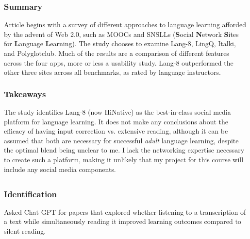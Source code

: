 \documentclass[
	letterpaper, %
]{jdf}
\begin{document}
\subsubsection{Summary}
Article begins with a survey of different approaches to language learning afforded by the advent of Web 2.0, such as MOOCs and SNSLLs (\textbf{S}ocial \textbf{N}etwork \textbf{S}ites for \textbf{L}anguage \textbf{L}earning). The study chooses to examine Lang-8, LingQ, Italki, and Polyglotclub. Much of the results are a comparison of different features across the four apps, more or less a usability study. Lang-8 outperformed the other three sites across all benchmarks, as rated by language instructors.

\subsubsection{Takeaways}
The study identifies Lang-8 (now HiNative) as the best-in-class social media platform for language learning. It does not make any conclusions about the efficacy of having input correction vs. extensive reading, although it can be assumed that both are necessary for successful \textit{adult} language learning, despite the optimal blend being unclear to me. I lack the networking expertise necessary to create such a platform, making it unlikely that my project for this course will include any social media components.

\subsection{}
\subsubsection{Identification}
Asked Chat GPT for papers that explored whether listening to a transcription of a text while simultaneously reading it improved learning outcomes compared to silent reading.
\end{document}
